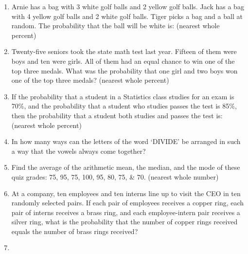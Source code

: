\documentclass[../uilmath.tex]{subfiles}
\begin{document}
\begin{enumerate}[label=\bfseries\arabic*.]
    \item %
    Arnie has a bag with 3 white golf balls and 2 yellow golf balls. Jack has a bag with 4 yellow golf balls and 2 white golf balls.
    Tiger picks a bag and a ball at random. The probability that the ball will be white is: (nearest whole percent)

    \item %
    Twenty-five seniors took the state math test last year. Fifteen of them were boys and ten were girls. All of them had an equal chance to win one of the top three medals. What was the probability that one girl and two boys won one of the top three medals? (nearest whole percent)

    \item %
    If the probability that a student in a Statistics class studies for an exam is 70\%, and the probability that a student who studies passes the test is 85\%, then the probability that a student both studies and passes the test is: (nearest whole percent)

    \item %
    In how many ways can the letters of the word `DIVIDE' be arranged in such a way that the vowels always come together?

    \item %
    Find the average of the arithmetic mean, the median, and the mode of these quiz grades: 75, 95, 75, 100, 95, 80, 75, \& 70. (nearest whole number)

    \item %
    At a company, ten employees and ten interns line up to visit the CEO in ten randomly selected pairs. If each pair of employees 
    receives a copper ring, each pair of interns receives a brass ring, and each employee-intern pair receives a silver ring, what is the probability that the number of copper rings 
    received equals the number of brass rings received?

    \item %
    
\end{enumerate}
\end{document}
